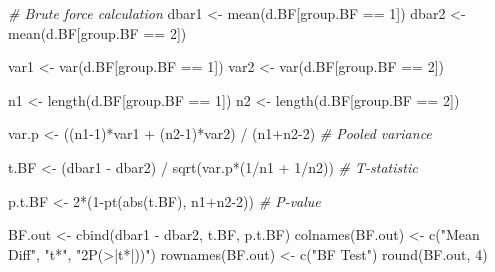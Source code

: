 \documentclass[
]{article}
\newenvironment{Shaded}{\begin{snugshade}}{\end{snugshade}}
\newcommand{\CommentTok}[1]{\textcolor[rgb]{0.56,0.35,0.01}{\textit{#1}}}
\newcommand{\DecValTok}[1]{\textcolor[rgb]{0.00,0.00,0.81}{#1}}
\newcommand{\FunctionTok}[1]{\textcolor[rgb]{0.00,0.00,0.00}{#1}}
\newcommand{\NormalTok}[1]{#1}
\newcommand{\OtherTok}[1]{\textcolor[rgb]{0.56,0.35,0.01}{#1}}
\newcommand{\SpecialCharTok}[1]{\textcolor[rgb]{0.00,0.00,0.00}{#1}}
\newcommand{\StringTok}[1]{\textcolor[rgb]{0.31,0.60,0.02}{#1}}
\begin{document}
\begin{Shaded}
\begin{Highlighting}[]
\CommentTok{\# Brute force calculation }
\NormalTok{dbar1 }\OtherTok{\textless{}{-}} \FunctionTok{mean}\NormalTok{(d.BF[group.BF }\SpecialCharTok{==} \DecValTok{1}\NormalTok{])}
\NormalTok{dbar2 }\OtherTok{\textless{}{-}} \FunctionTok{mean}\NormalTok{(d.BF[group.BF }\SpecialCharTok{==} \DecValTok{2}\NormalTok{])}

\NormalTok{var1 }\OtherTok{\textless{}{-}} \FunctionTok{var}\NormalTok{(d.BF[group.BF }\SpecialCharTok{==} \DecValTok{1}\NormalTok{])}
\NormalTok{var2 }\OtherTok{\textless{}{-}} \FunctionTok{var}\NormalTok{(d.BF[group.BF }\SpecialCharTok{==} \DecValTok{2}\NormalTok{])}

\NormalTok{n1 }\OtherTok{\textless{}{-}} \FunctionTok{length}\NormalTok{(d.BF[group.BF }\SpecialCharTok{==} \DecValTok{1}\NormalTok{])}
\NormalTok{n2 }\OtherTok{\textless{}{-}} \FunctionTok{length}\NormalTok{(d.BF[group.BF }\SpecialCharTok{==} \DecValTok{2}\NormalTok{])}

\NormalTok{var.p }\OtherTok{\textless{}{-}}\NormalTok{ ((n1}\DecValTok{{-}1}\NormalTok{)}\SpecialCharTok{*}\NormalTok{var1 }\SpecialCharTok{+}\NormalTok{ (n2}\DecValTok{{-}1}\NormalTok{)}\SpecialCharTok{*}\NormalTok{var2) }\SpecialCharTok{/}\NormalTok{ (n1}\SpecialCharTok{+}\NormalTok{n2}\DecValTok{{-}2}\NormalTok{) }\CommentTok{\# Pooled variance}

\NormalTok{t.BF }\OtherTok{\textless{}{-}}\NormalTok{ (dbar1 }\SpecialCharTok{{-}}\NormalTok{ dbar2) }\SpecialCharTok{/} \FunctionTok{sqrt}\NormalTok{(var.p}\SpecialCharTok{*}\NormalTok{(}\DecValTok{1}\SpecialCharTok{/}\NormalTok{n1 }\SpecialCharTok{+} \DecValTok{1}\SpecialCharTok{/}\NormalTok{n2)) }\CommentTok{\# T{-}statistic}

\NormalTok{p.t.BF }\OtherTok{\textless{}{-}} \DecValTok{2}\SpecialCharTok{*}\NormalTok{(}\DecValTok{1}\SpecialCharTok{{-}}\FunctionTok{pt}\NormalTok{(}\FunctionTok{abs}\NormalTok{(t.BF), n1}\SpecialCharTok{+}\NormalTok{n2}\DecValTok{{-}2}\NormalTok{)) }\CommentTok{\# P{-}value}

\NormalTok{BF.out }\OtherTok{\textless{}{-}} \FunctionTok{cbind}\NormalTok{(dbar1 }\SpecialCharTok{{-}}\NormalTok{ dbar2, t.BF, p.t.BF)}
\FunctionTok{colnames}\NormalTok{(BF.out) }\OtherTok{\textless{}{-}} \FunctionTok{c}\NormalTok{(}\StringTok{"Mean Diff"}\NormalTok{, }\StringTok{"t*"}\NormalTok{, }\StringTok{"2P(\textgreater{}|t*|))"}\NormalTok{)}
\FunctionTok{rownames}\NormalTok{(BF.out) }\OtherTok{\textless{}{-}} \FunctionTok{c}\NormalTok{(}\StringTok{"BF Test"}\NormalTok{)}
\FunctionTok{round}\NormalTok{(BF.out, }\DecValTok{4}\NormalTok{)}
\end{Highlighting}
\end{Shaded}
\end{document}
